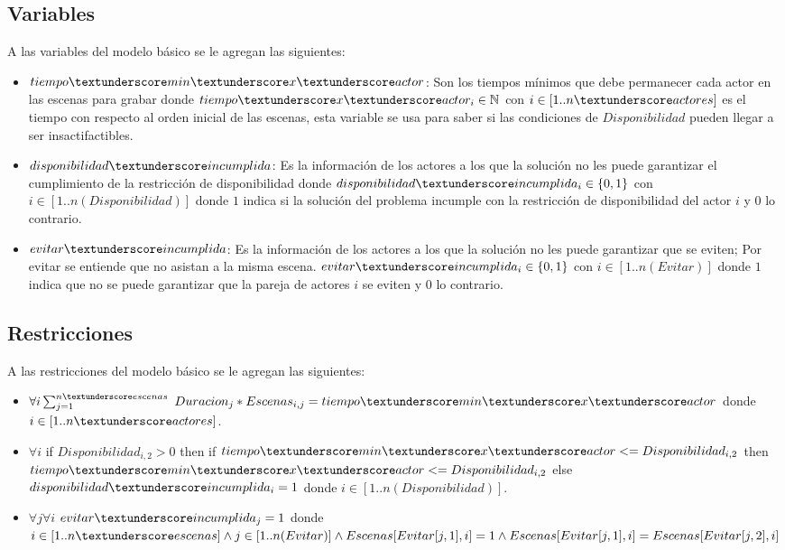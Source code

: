 \documentclass{article}
\begin{document}
\subsection{Variables}
A las variables del modelo básico se le agregan las siguientes:
\begin{itemize}
    \item $tiempo\textunderscore min\textunderscore x\textunderscore actor$: Son los tiempos mínimos que debe permanecer cada actor en las escenas para grabar donde $tiempo\textunderscore  x\textunderscore actor_i \in \mathbb{N}$ con $i \in [1..n\textunderscore actores]$ es el tiempo con respecto al orden inicial de las escenas, esta variable se usa para saber si las condiciones de $Disponibilidad$ pueden llegar a ser insactifactibles.
    \item $disponibilidad\textunderscore incumplida$: Es la información de los actores a los que la solución no les puede garantizar el cumplimiento de la restricción de disponibilidad donde $disponibilidad\textunderscore incumplida_i \in \{0,1\}$ con $i \in [1..n(Disponibilidad)]$ donde $1$ indica si la solución del problema incumple con la restricción de disponibilidad del actor $i$ y $0$ lo contrario.
    \item $evitar\textunderscore incumplida$: Es la información de los actores a los que la solución no les puede garantizar que se eviten; Por evitar se entiende que no asistan a la misma escena. $evitar\textunderscore incumplida_i \in \{0,1\}$ con $i \in [1..n(Evitar)]$ donde $1$ indica que no se puede garantizar que la pareja de actores $i$ se eviten y $0$ lo contrario.
\end{itemize}

\subsection{Restricciones}
A las restricciones del modelo básico se le agregan las siguientes:
\begin{itemize}
    \item $\forall i\sum_{j=1}^{n\textunderscore escenas}$  $Duracion_j * Escenas_{i,j} = tiempo\textunderscore min\textunderscore x\textunderscore actor$\newline
          donde $i \in [1..n\textunderscore actores]$.
    \item $\forall i$  if $Disponibilidad_{i,2} > 0$ then if $tiempo\textunderscore min\textunderscore x\textunderscore actor <= Disponibilidad_{i,2}$ then $tiempo\textunderscore min\textunderscore x\textunderscore actor <= Disponibilidad_{i,2}$ else $disponibilidad\textunderscore incumplida_i = 1$\newline
          donde $i \in [1..n(Disponibilidad)]$.
    \item $\forall j \forall i$ $evitar\textunderscore incumplida_j=1$   \newline donde $i \in [1..n\textunderscore escenas] \land j \in [1..n(Evitar)] \land Escenas[Evitar[j,1],i]=1 \land Escenas[Evitar[j,1],i]=Escenas[Evitar[j,2],i]$
\end{itemize}
\end{document}
